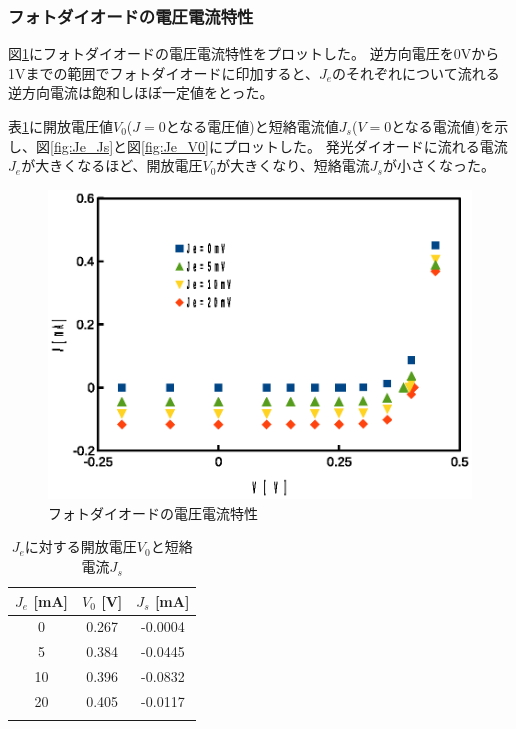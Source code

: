 \documentclass[11pt,a4]{jarticle}
\begin{document}
\subsubsection{フォトダイオードの電圧電流特性}
図\ref{fig:photodiode}にフォトダイオードの電圧電流特性をプロットした。
逆方向電圧を0Vから1Vまでの範囲でフォトダイオードに印加すると、$J_e$のそれぞれについて流れる逆方向電流は飽和しほぼ一定値をとった。

表\ref{tab:Je_Vo_Js}に開放電圧値$V_0$($J=0$となる電圧値)と短絡電流値$J_s$($V=0$となる電流値)を示し、図\ref{fig:Je_Js}と図\ref{fig:Je_V0}にプロットした。
発光ダイオードに流れる電流$J_e$が大きくなるほど、開放電圧$V_0$が大きくなり、短絡電流$J_s$が小さくなった。

\begin{figure}[!htbp]
   \begin{center}
    \includegraphics[width=0.8\hsize]{./photodiode.eps}
    \caption{フォトダイオードの電圧電流特性}
     \label{fig:photodiode}
   \end{center}
\end{figure}
\begin{table}[!htbp]
   \begin{center}
  \begin{tabular}{ccc}
    $J_e$ [mA]  & $V_0$ [V] & $J_s$ [mA]\\ \hline
    0 & 0.267 & -0.0004 \\
    5 & 0.384 & -0.0445 \\
    10 & 0.396 & -0.0832 \\
    20 & 0.405 & -0.0117 \\
  \label{tab:Je_Vo_Js}
  \end{tabular}
     \end{center}
       \caption{$J_e$に対する開放電圧$V_0$と短絡電流$J_s$}
\end{table}
\end{document}
